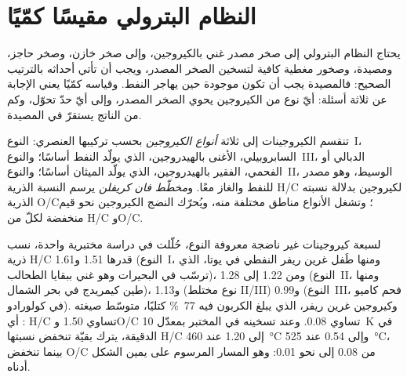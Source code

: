 \section{النظام البترولي مقيسًا كمّيًا}\label{sec:b2:energy-geology:petroleum}

يحتاج النظام البترولي إلى صخر مصدر غني بالكيروجين، وإلى صخر خازن، وصخر حاجز، ومصيدة، وصخور مغطية كافية
لتسخين الصخر المصدر، ويجب أن تأتي أحداثه بالترتيب الصحيح: فالمصيدة يجب أن تكون
موجودة حين يهاجر النفط. وقياسه كمّيًا يعني الإجابة عن ثلاثة أسئلة: أيّ نوع من الكيروجين
يحوي الصخر المصدر، وإلى أيّ حدّ تحوّل، وكم من الناتج يستقرّ في
المصيدة.

\begin{definition}\label{def:b2:energy-geology:kerogen}
تنقسم الكيروجينات إلى ثلاثة \emph{أنواع الكيروجين} بحسب تركيبها العنصري:
النوع~I، السابروبيلي، الأغنى بالهيدروجين، الذي يولّد النفط أساسًا؛ والنوع~III، الدبالي أو الفحمي،
الفقير بالهيدروجين، الذي يولّد الميثان أساسًا؛ والنوع~II، الوسيط، وهو مصدر للنفط
والغاز معًا. و\emph{مخطّط فان كريفلن} يرسم النسبة الذرية H/C
لكيروجين بدلالة نسبته الذرية O/C؛ وتشغل الأنواع مناطق مختلفة منه، ويُحرّك النضج
الكيروجين نحو قيم منخفضة لكلّ من H/C وO/C.
\end{definition}

لسبعة كيروجينات غير ناضجة معروفة النوع، حُلّلت في دراسة مختبرية واحدة، نسب ذرية H/C قدرها
1.51 و1.61 (النوع~I، ومنها طَفل غرين ريفر النفطي في يوتا، الذي ترسّب في البحيرات وهو غني
ببقايا الطحالب)، ومن 1.22 إلى 1.28 (النوع~II، ومنها طين كيمريدج في بحر الشمال)،
و1.13 (نوع مختلط II/III) و0.99 (النوع~III، فحم كاميو في كولورادو). وكيروجين غرين ريفر،
الذي يبلغ الكربون فيه \qty{77}{\percent} كتليًا، متوسّط صيغته : أي H/C تساوي 1.50
وO/C تساوي 0.08. وعند تسخينه في المختبر بمعدّل \qty{10}{K} في الدقيقة، يترك بقيّة تنخفض نسبتها H/C إلى
1.20 عند \qty{460}{\celsius} وإلى 0.54 عند \qty{525}{\celsius}، بينما تنخفض O/C من 0.08 إلى نحو
0.01: وهو المسار المرسوم على يمين الشكل أدناه.

